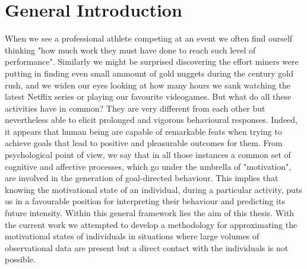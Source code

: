\section{General Introduction}
When we see a professional athlete competing at an event we often find ourself thinking "how much work they must have done to reach such level of performance". Similarly we might be surprised discovering the effort miners were putting in finding even small ammount of gold nuggets during the  century gold rush, and we widen our eyes looking at how many hours we sank watching the latest Netflix series or playing our favourite videogames. But what do all these activities have in common? They are very different from each other but nevertheless able to elicit prolonged and vigorous behavioural responses. Indeed, it appears that human being are capable of remarkable feats when trying to achieve goals that lead to positive and pleasurable outcomes for them. From psychological point of view, we say that in all those instances a common set of cognitive and affective processes, which go under the umbrella of "motivation", are involved in the generation of goal-directed behaviour. This implies that knowing the motivational state of an individual, during a particular activity, puts us in a favourable position for interpreting their behaviour and predicting its future intensity. Within this general framework lies the aim of this thesis. With the current work we attempted to develop a methodology for approximating the motivational states of individuals in situations where large volumes of observational data are present but a direct contact with the individuals is not possible.


